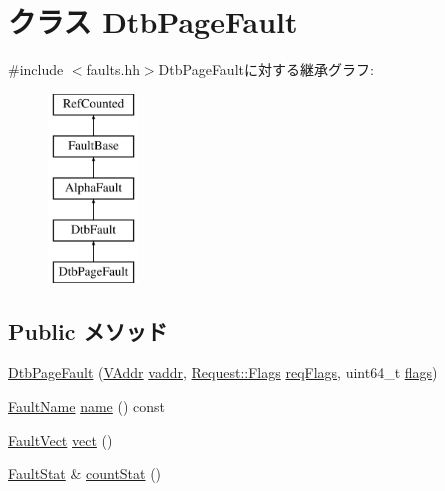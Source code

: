 \hypertarget{classAlphaISA_1_1DtbPageFault}{
\section{クラス DtbPageFault}
\label{classAlphaISA_1_1DtbPageFault}
}


{\ttfamily \#include $<$faults.hh$>$}DtbPageFaultに対する継承グラフ:\begin{figure}[H]
\begin{center}
\leavevmode
\includegraphics[height=5cm]{classAlphaISA_1_1DtbPageFault}
\end{center}
\end{figure}
\subsection*{Public メソッド}
\begin{DoxyCompactItemize}
\item 
\hyperlink{classAlphaISA_1_1DtbPageFault_ae4f2171aefd458e8a5efafda07781ef6}{DtbPageFault} (\hyperlink{structAlphaISA_1_1VAddr}{VAddr} \hyperlink{classAlphaISA_1_1DtbFault_a48d5190e0fd672e7fe9d248a670b8ea3}{vaddr}, \hyperlink{classFlags}{Request::Flags} \hyperlink{classAlphaISA_1_1DtbFault_a4342a385c094b40ed46b0674fbb0b223}{reqFlags}, uint64\_\-t \hyperlink{classAlphaISA_1_1DtbFault_a899a76dc5f03f0d4ea3793c339e07ee9}{flags})
\item 
\hyperlink{sim_2faults_8hh_abb196df64725e5c2568c900cf130d8d7}{FaultName} \hyperlink{classAlphaISA_1_1DtbPageFault_a73adb23259baf912a81683a9790a303f}{name} () const 
\item 
\hyperlink{classm5_1_1params_1_1Addr}{FaultVect} \hyperlink{classAlphaISA_1_1DtbPageFault_ae15c5d7ab0162821b93d668d0b225198}{vect} ()
\item 
\hyperlink{classStats_1_1Scalar}{FaultStat} \& \hyperlink{classAlphaISA_1_1DtbPageFault_a6c79663c761ff57265459f7e3aefaf4c}{countStat} ()
\end{DoxyCompactItemize}
